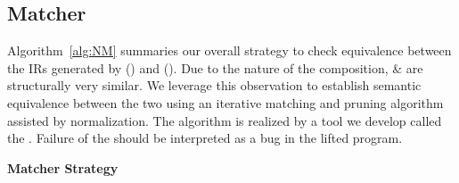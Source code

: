 \subsection{Matcher}\label{sec:matcher}
Algorithm~\ref{alg:NM} summaries our overall strategy to check equivalence 
between the IRs generated by \mcsema (\T) and \compd (\TP). Due to the nature 
of the composition, \T \& \TP are structurally very similar. 
We leverage this observation to establish 
semantic equivalence between the two using an iterative matching and pruning 
algorithm assisted by 
normalization.  The algorithm is realized by a tool 
we develop called the \matcher. Failure of the  
\matcher should be interpreted as a  bug in the lifted program. 
\newcommand\mycommfont[1]{\footnotesize\textcolor{blue}{#1}}
\begin{algorithm}
    
    
    \BlankLine
    
    \caption{\textbf{Matcher Strategy}}\label{alg:NM}
\end{algorithm}


